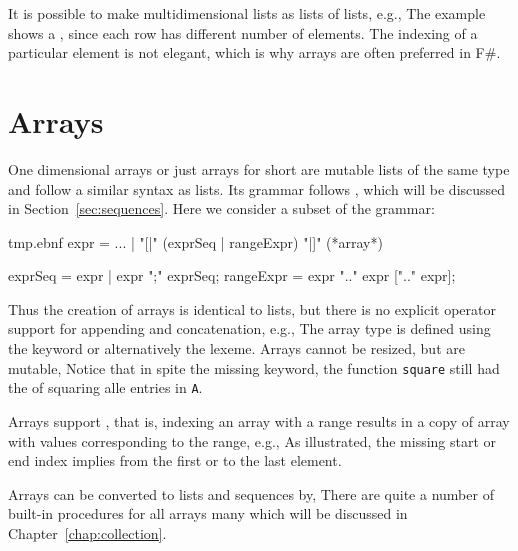 It is possible to make multidimensional lists as lists of lists, e.g., 
%
%
The example shows a , since each row has different number of elements. The indexing of a particular element is not elegant, which is why arrays are often preferred in F\#.

\section{Arrays}
\label{sec:arrays}
One dimensional arrays or just arrays for short are mutable lists of the same type and follow a similar syntax as lists. Its grammar follows , which will be discussed in Section~\ref{sec:sequences}. Here we consider a subset of the grammar:
%
\begin{verbatimwrite}{tmp.ebnf}
expr = ... 
  | "[|" (exprSeq | rangeExpr) "|]" (*array*)

exprSeq =  expr | expr ";" exprSeq;
rangeExpr = expr ".." expr [".." expr];
\end{verbatimwrite}
%
Thus the creation of arrays is identical to lists, but there is no explicit operator support for appending and concatenation, e.g.,
%
%
The array type is defined using the  keyword or alternatively the \keyword{[]} lexeme. Arrays cannot be resized, but are mutable,
%
%
Notice that in spite the missing  keyword, the function \lstinline{square} still had the  of squaring alle entries in \lstinline{A}.  

Arrays support , that is, indexing an array with a range results in a copy of array with values corresponding to the range, e.g.,
%
%
As illustrated, the missing start or end index implies from the first or to the last element.

Arrays can be converted to lists and sequences by,
%
%
There are quite a number of built-in procedures for all arrays many which will be discussed in Chapter~\ref{chap:collection}.

